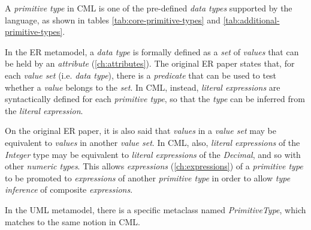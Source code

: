 A \emph{primitive type} in CML is one of the pre-defined \emph{data types}
supported by the language,
as shown in tables \ref{tab:core-primitive-types} and \ref{tab:additional-primitive-types}.

In the ER \cite{er} metamodel,
a \emph{data type} is formally defined as a \emph{set} of \emph{values}
that can be held by an \emph{attribute} (\ref{ch:attributes}).
The original ER paper \cite{er} states that,
for each \emph{value set} (i.e. \emph{data type}),
there is a \emph{predicate} that can be used to test
whether a \emph{value} belongs to the \emph{set}.
In CML, instead,
\emph{literal expressions} are syntactically defined for each \emph{primitive type},
so that the \emph{type} can be inferred from the \emph{literal expression}.

On the original ER paper,
it is also said that \emph{values} in a \emph{value set}
may be equivalent to \emph{values} in another \emph{value set}.
In CML, also,
\emph{literal expressions} of the \emph{Integer} type may be equivalent
to \emph{literal expressions} of the \emph{Decimal},
and so with other \emph{numeric types}.
This allows \emph{expressions} (\ref{ch:expressions}) of a \emph{primitive type}
to be promoted to \emph{expressions} of another \emph{primitive type}
in order to allow \emph{type inference} of composite \emph{expressions}.

In the UML \cite{uml} metamodel,
there is a specific metaclass named \emph{PrimitiveType},
which matches to the same notion in CML.

